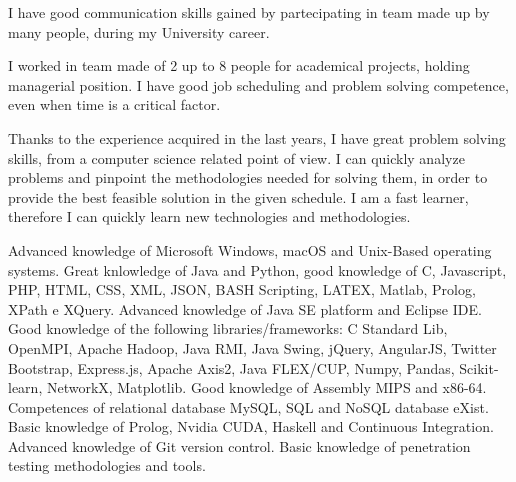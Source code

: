 \documentclass[helvetica,english,logo,notitle,totpages,utf8]{europecv2013}
\begin{document}
\begin{europecv}

\ecvlanguageheader
{}


\ecvlanguagefooter[5pt]

{
I have good communication skills gained by partecipating in team made up by many people, during my University career.
}

{I worked in team made of 2 up to 8 people for academical projects, holding managerial position. I have good job scheduling and problem solving competence, even when time is a critical factor.}



{Thanks to the experience acquired in the last years, I have great problem solving skills, from a computer science related point of view. I can quickly analyze problems and pinpoint the methodologies needed for solving them, in order to provide the best feasible solution in the given schedule. I am a fast learner, therefore I can quickly learn new technologies and methodologies.}

{Advanced knowledge of Microsoft Windows, macOS and Unix-Based operating systems. Great knlowledge of Java and Python, good knowledge of C, Javascript, PHP, HTML, CSS, XML, JSON, BASH Scripting, LATEX, Matlab, Prolog, XPath e XQuery. Advanced knowledge of Java SE platform and Eclipse IDE. Good knowledge of the following libraries/frameworks: C Standard Lib, OpenMPI, Apache Hadoop, Java RMI, Java Swing, jQuery, AngularJS, Twitter Bootstrap, Express.js, Apache Axis2, Java FLEX/CUP, Numpy, Pandas, Scikit-learn, NetworkX, Matplotlib. Good knowledge of Assembly MIPS and x86-64. Competences of relational database MySQL, SQL and NoSQL database eXist. Basic knowledge of Prolog, Nvidia CUDA, Haskell and Continuous Integration. Advanced knowledge of Git version control. Basic knowledge of penetration testing methodologies and tools.}



\end{europecv}
\end{document}
